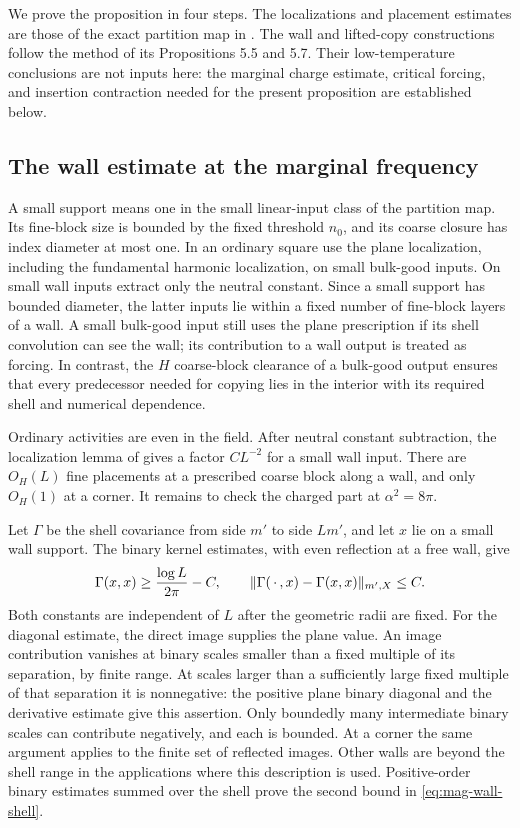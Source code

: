 We prove the proposition in four steps.  The localizations and
placement estimates are those of the exact partition map in
\cite[Section 4]{B}.  The wall and lifted-copy
constructions follow the method of its Propositions
5.5 and 5.7.  Their
low-temperature conclusions are not inputs here: the marginal
charge estimate, critical forcing, and insertion contraction needed
for the present proposition are established below.

\subsection{The wall estimate at the marginal frequency}

A small support means one in the small linear-input class of the
partition map.  Its fine-block size is bounded by the fixed
threshold $n_0$, and its coarse closure has index diameter at most
one.  In an ordinary square use the plane localization, including
the fundamental harmonic localization, on small bulk-good inputs.
On small wall inputs extract only the neutral constant.  Since a
small support has bounded diameter, the latter inputs lie within
a fixed number of fine-block layers of a wall.  A small bulk-good
input still uses the plane prescription if its shell convolution
can see the wall; its contribution to a wall output is treated as
forcing.  In contrast, the $H$ coarse-block clearance of a bulk-good
output ensures that every predecessor needed for copying lies in
the interior with its required shell and numerical dependence.

Ordinary activities are even in the field.  After neutral constant
subtraction, the localization lemma of
\cite[Lemma 4.5]{B} gives a factor $CL^{-2}$
for a small wall input.  There are $O_H(L)$ fine placements at a
prescribed coarse block along a wall, and only $O_H(1)$ at a
corner.  It remains to check the charged part at
$\alpha^2=8\pi$.

Let $\Gamma$ be the shell covariance from side $m'$ to side $Lm'$,
and let $x$ lie on a small wall support.  The binary kernel
estimates, with even reflection at a free wall, give
\begin{equation}\label{eq:mag-wall-shell}
 \Gamma(x,x)\ge\frac{\log L}{2\pi}-C,
 \qquad
 \lVert\Gamma(\,\cdot\,,x)-\Gamma(x,x)\rVert_{m',X}\le C.
\end{equation}
Both constants are independent of $L$ after the geometric radii
are fixed.  For the diagonal estimate, the direct image supplies
the plane value.  An image contribution vanishes at binary scales
smaller than a fixed multiple of its separation, by finite range.
At scales larger than a sufficiently large fixed multiple of that
separation it is nonnegative: the positive plane binary diagonal
and the derivative estimate give this assertion.  Only boundedly
many intermediate binary scales can contribute negatively, and
each is bounded.  At a corner the same argument applies to the
finite set of reflected images.  Other walls are beyond the shell
range in the applications where this description is used.
Positive-order binary estimates summed over the shell prove the
second bound in \eqref{eq:mag-wall-shell}.

